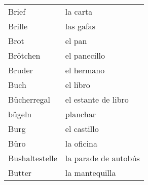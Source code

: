 \begin{longtable}{p{} p{}}
Brief & la carta\\
Brille & las gafas\\
Brot & el pan\\
Brötchen & el panecillo\\
Bruder & el hermano\\
Buch & el libro \\
Bücherregal & el estante de libro\\
bügeln & planchar\\
Burg & el castillo\\
Büro & la oficina\\
Bushaltestelle & la parade de autobús\\
Butter & la mantequilla \\
\end{longtable}
